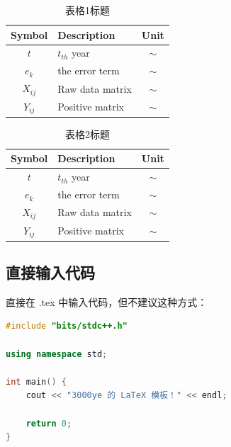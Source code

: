 \documentclass[12pt, a4paper, twoside]{article}
\begin{document}
\begin{minipage}[c]{0.45\textwidth}
    \centering
    \begin{table}[H]
        \centering
        \caption{表格1标题}
            \begin{tabular}{c||lc}
            \toprule
            Symbol  & Description & Unit \\
            \midrule
            $t$ & $t_{th}$ year & $\sim$ \\
            $e_k$ & the error term & $\sim$ \\
            $X_{ij}$ & Raw data matrix & $\sim$ \\
            $Y_{ij}$ & Positive matrix & $\sim$ \\
            \bottomrule
            \end{tabular}%
        \label{tab: 表格1标题}%
    \end{table}%
\end{minipage}
\begin{minipage}[c]{0.45\textwidth}
    \centering
    \begin{table}[H]
        \centering
        \caption{表格2标题}
            \begin{tabular}{c||lc}
            \toprule
            Symbol  & Description & Unit \\
            \midrule
            $t$ & $t_{th}$ year & $\sim$ \\
            $e_k$ & the error term & $\sim$ \\
            $X_{ij}$ & Raw data matrix & $\sim$ \\
            $Y_{ij}$ & Positive matrix & $\sim$ \\
            \bottomrule
            \end{tabular}%
        \label{tab: 表格2标题}%
    \end{table}%
\end{minipage}

\subsection{直接输入代码}

直接在 .tex 中输入代码，但不建议这种方式：

\begin{lstlisting}[language=c++,title={code.cpp}]
#include "bits/stdc++.h"

using namespace std;

int main() {
    cout << "3000ye 的 LaTeX 模板！" << endl;

    return 0;
}
\end{lstlisting}
\end{document}
